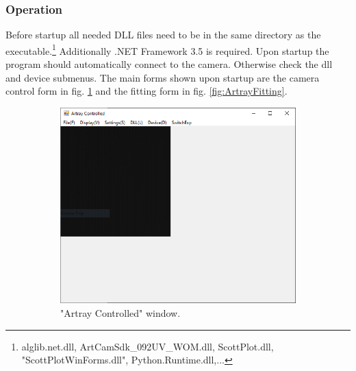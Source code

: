 \documentclass[twoside,openright,listof=numbered]{scrreprt}
\begin{document}
\subsubsection{Operation}
Before startup all needed DLL files need to be in the same directory as the executable.\footnote{alglib.net.dll, ArtCamSdk\_092UV\_WOM.dll, ScottPlot.dll, "ScottPlotWinForms.dll", Python.Runtime.dll,...} Additionally .NET Framework 3.5 is required. Upon startup the program should automatically connect to the camera. Otherwise check the dll and device submenus.
The main forms shown upon startup are the camera control form in fig. \ref{fig:ArtrayMain} and the fitting form in fig. \ref{fig:ArtrayFitting}.

\begin{figure}[hbtp]
\centering
\begin{subfigure}[t]{0.49\linewidth}
\includegraphics[width = \columnwidth]{images/ArtrayExamplePics/ArtrayControlledMain.PNG}
\caption{"Artray Controlled" window.\label{fig:ArtrayMain}}
\end{subfigure}
\hfill
\begin{subfigure}[t]{0.49\linewidth}
\centering

\end{subfigure}
\end{figure}
\end{document}
